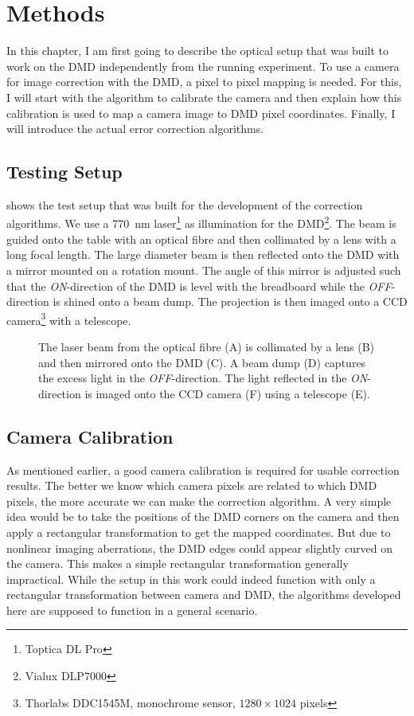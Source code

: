 

\chapter{Methods}
In this chapter, I am first going to describe the optical setup that was built to work on the DMD independently from the running experiment. To use a camera for image correction with the DMD, a pixel to pixel mapping is needed. For this, I will start with the algorithm to calibrate the camera and then explain how this calibration is used to map a camera image to DMD pixel coordinates. Finally, I will introduce the actual error correction algorithms.

\section{Testing Setup}
 shows the test setup that was built for the development of the correction algorithms. We use a \SI{770}{nm} laser\footnote{Toptica DL Pro} as illumination for the DMD\footnote{Vialux DLP7000}. The beam is guided onto the table with an optical fibre and then collimated by a lens with a long focal length. The large diameter beam is then reflected onto the DMD with a mirror mounted on a rotation mount. The angle of this mirror is adjusted such that the \emph{ON}-direction of the DMD is level with the breadboard while the \emph{OFF}-direction is shined onto a beam dump. The projection is then imaged onto a CCD camera\footnote{Thorlabs DDC1545M, monochrome sensor, $1280\times 1024$ pixels} with a telescope.
\begin{figure}[htbp]
    \centering
    
    \caption[Test setup for the DMD]{The laser beam from the optical fibre (A) is collimated by a lens (B) and then mirrored onto the DMD (C). A beam dump (D) captures the excess light in the \emph{OFF}-direction. The light reflected in the \emph{ON}-direction is imaged onto the CCD camera (F) using a telescope (E).}
    \label{fig:dmd_test_setup}
\end{figure}

\section{Camera Calibration}
As mentioned earlier, a good camera calibration is required for usable correction results. The better we know which camera pixels are related to which DMD pixels, the more accurate we can make the correction algorithm. A very simple idea would be to take the positions of the DMD corners on the camera and then apply a rectangular transformation to get the mapped coordinates. But due to nonlinear imaging aberrations, the DMD edges could appear slightly curved on the camera. This makes a simple rectangular transformation generally impractical. While the setup in this work could indeed function with only a rectangular transformation between camera and DMD, the algorithms developed here are supposed to function in a general scenario.

